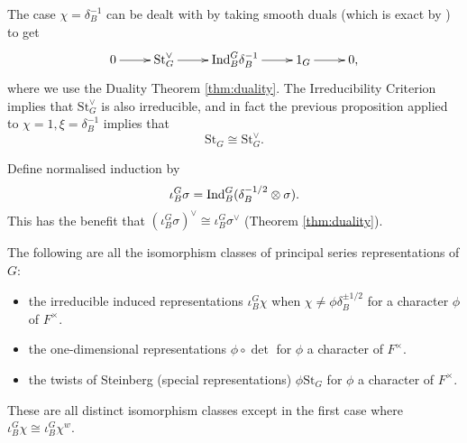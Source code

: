 The case $\chi = \delta_B^{-1}$ can be dealt with by taking smooth duals (which is exact by \cite[Lemma 2.10]{BH1}) to get 
$$\xymatrix{0 \ar[r] & \mathrm{St}_G^\vee \ar[r] & \Ind_B^G \delta_B^{-1} \ar[r] & 1_G \ar[r] & 0,}$$ where we use the Duality Theorem \ref{thm:duality}. The Irreducibility Criterion implies that $\mathrm{St}_G^\vee$ is also irreducible, and in fact the previous proposition applied to $\chi=1, \xi = \delta_B^{-1}$ implies that
$$\mathrm{St}_G \cong \mathrm{St}_G^\vee.$$

\begin{notn}
    Define normalised induction by
    $$\iota_B^G \sigma = \mathrm{Ind}_B^G (\delta_B^{-1/2} \otimes \sigma).$$
    This has the benefit that $(\iota_B^G \sigma)^\vee \cong \iota_B^G \sigma^\vee$ (Theorem \ref{thm:duality}).
\end{notn}

\begin{thm}\label{classify}
    The following are all the isomorphism classes of principal series representations of $G$:
    \begin{itemize}
        \item the irreducible induced representations $\iota_B^G \chi$ when $\chi \neq \phi \delta_B^{\pm 1/2}$ for a character $\phi$ of $F^\times$.
        \item the one-dimensional representations $\phi \circ \det$ for $\phi$ a character of $F^\times$.
        \item the twists of Steinberg (special representations) $\phi \mathrm{St}_G$ for $\phi$ a character of $F^\times$.
    \end{itemize}
    These are all distinct isomorphism classes except in the first case where $\iota_B^G \chi \cong \iota_B^G \chi^w$.
\end{thm}

\newpage